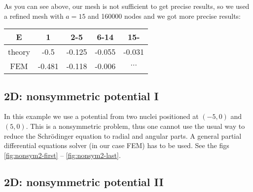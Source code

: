 As you can see above, our mesh is not sufficient to get precise results, so we
used a refined mesh with $a=15$ and 160000 nodes and we got more precise
results:

\begin{tabular}{ c | c c c c }
E      & 1 & 2-5 & 6-14 & 15- \\
\hline
theory & -0.5 & -0.125 & -0.055 & -0.031 \\
FEM    & -0.481 & -0.118 & -0.006 & $\cdots$ \\
\end{tabular}

\subsection{2D: nonsymmetric potential I}

In this example we use a potential from two nuclei positioned at $(-5, 0)$ and
$(5, 0)$. This is a nonsymmetric problem, thus one cannot use the usual
way to reduce the Schr\"odinger equation to radial and angular
parts. A general partial differential equations solver (in our case FEM) has to
be used. See the figs \ref{fig:nonsym2-first} --
\ref{fig:nonsym2-last}.





\clearpage






\subsection{2D: nonsymmetric potential II}

